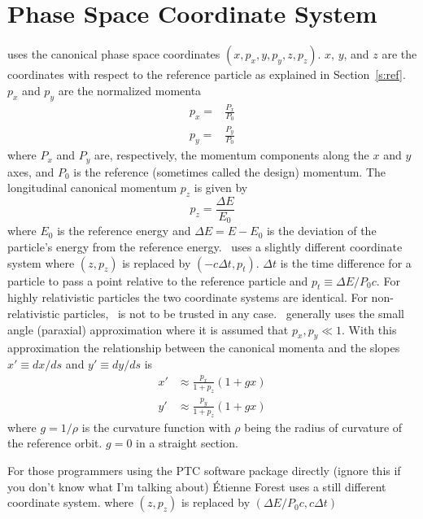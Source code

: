 \section{Phase Space Coordinate System}

\bmad uses the canonical phase space coordinates 
$(x, p_x, y, p_y, z, p_z)$. $x$, $y$, and $z$ are the
coordinates with respect to the reference particle as explained in
Section~\ref{s:ref}. $p_x$ and $p_y$ are the normalized momenta
\begin{align}
  p_x = &\frac{P_x}{P_0} \\
  p_y = &\frac{P_y}{P_0}
\end{align}
where $P_x$ and $P_y$ are, respectively, the momentum components along the $x$ and
$y$ axes, and $P_0$ is the reference (sometimes called the
design) momentum. The longitudinal canonical momentum $p_z$ is given by
\begin{equation}
  p_z = \frac{\Delta E}{E_0}
\end{equation}
where $E_0$ is the reference energy and $\Delta E = E - E_0$ is the
deviation of the particle's energy from the reference energy. \mad\ uses
a slightly different coordinate system where $(z, p_z)$ is
replaced by $(-c\Delta t, p_t)$. $\Delta t$ is the time
difference for a particle to pass a point relative to the reference
particle and $p_t \equiv \Delta E / P_0 c$. For highly relativistic
particles the two coordinate systems are identical. For
non-relativistic particles, \bmad\ is not to be trusted in any
case. \bmad\ generally uses the small angle (paraxial) approximation
where it is assumed that $p_x, p_y \ll 1$. With this approximation the
relationship between the canonical momenta and the slopes $x' \equiv dx/ds$
and $y' \equiv dy/ds$ is
\begin{align}
  x' &\approx \frac{p_x}{1 + p_z} (1 + g x) \\
  y' &\approx \frac{p_y}{1 + p_z} (1 + g x) 
\end{align}
where $g = 1/\rho$ is the curvature function with $\rho$ being the radius
of curvature of the reference orbit. $g = 0$ in a straight section.

For those programmers using the PTC software package directly (ignore
this if you don't know what I'm talking about) \'Etienne Forest uses a still
different coordinate system. where  $(z, p_z)$ is replaced by
$(\Delta E/P_0 c, c \Delta t)$